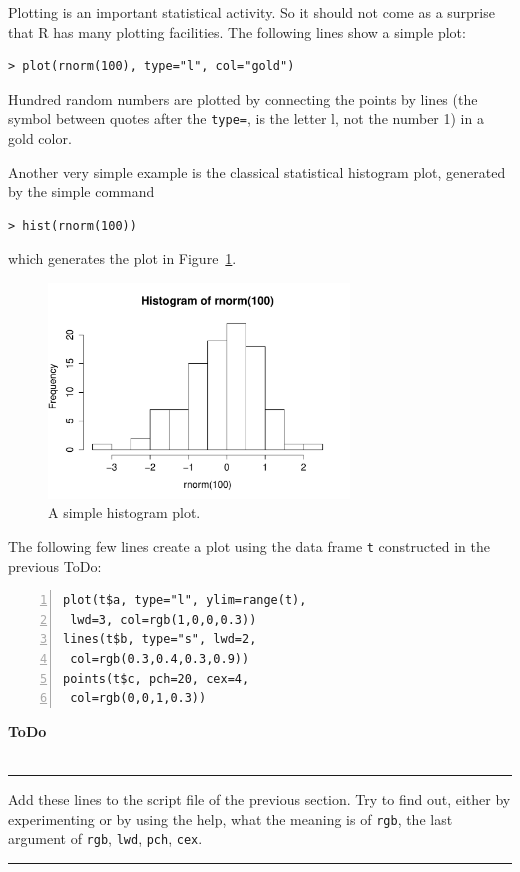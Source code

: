 \documentclass[a4paper,11pt,twocolumn,tablecaptionabove]{scrartcl}
\newenvironment{ToDo} {%
  \begin{flushright}
    \hfill
    \begin{minipage}{0.95\columnwidth}         %
    \textsf{\textbf{ToDo}} \\
      \vspace{-0.85cm}\\
      {\color{Gray}\rule[-0.1cm]{\columnwidth}{1.5pt}}} { %
      {\color{Gray} \rule[0.3cm]{\columnwidth}{1.5pt}}
    \end{minipage}
    \vspace{1em}
  \end{flushright}
  }
\begin{document}
Plotting is an important statistical activity. So it should not come as a
surprise that R has many plotting facilities. 
The following lines show a simple plot:
\begin{Verbatim}[frame=single,gobble=0]
> plot(rnorm(100), type="l", col="gold")
\end{Verbatim}

\noindent Hundred random numbers are plotted by connecting the points by lines (the
symbol between quotes after the \texttt{type=}, is the letter l, not the
number 1) in a gold color.

Another very simple example is the classical statistical histogram plot, generated by the
simple command
\begin{Verbatim}[frame=single,gobble=0]
  > hist(rnorm(100))
\end{Verbatim}
which generates the plot in Figure~\ref{fig:hist}.
\begin{figure}[h]
  \centering
  \includegraphics[width=8cm]{img/hist.pdf}
  \caption{A simple histogram plot.}
  \label{fig:hist}
\end{figure}

\noindent The following few lines create a plot using the data frame \texttt{t}
constructed in the previous ToDo:
\begin{Verbatim}[frame=single,numbers=left,gobble=0, xleftmargin=0.35cm, numbersep=0.1cm]
plot(t$a, type="l", ylim=range(t), 
 lwd=3, col=rgb(1,0,0,0.3))
lines(t$b, type="s", lwd=2, 
 col=rgb(0.3,0.4,0.3,0.9))
points(t$c, pch=20, cex=4, 
 col=rgb(0,0,1,0.3))
\end{Verbatim} 

\begin{ToDo}
  Add these lines to the script file of the previous section. Try to
  find out, either by experimenting or by using the help, what the
  meaning is of \texttt{rgb}, the last argument of \texttt{rgb},
  \texttt{lwd}, \texttt{pch}, \texttt{cex}.\\
\end{ToDo}
\end{document}
